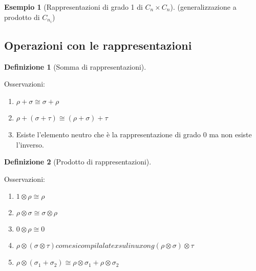 \documentclass[11pt]{article}
\theoremstyle{plain}
\theoremstyle{definition}
\newtheorem{defn}{Definizione}[section]
\newtheorem{exmp}{Esempio}[section]
\theoremstyle{remark}
\begin{document}
\begin{exmp}[Rappresentazioni di grado 1 di $C_n \times C_n$]


(generalizzazione a prodotto di $C_{n_i}$)
\end{exmp}














\newpage
\subsection{Operazioni con le rappresentazioni}

\begin{defn}[Somma di rappresentazioni]

\label{defn:somma di rappresentazioni}
\end{defn}

Osservazioni:

\begin{enumerate}
\item $\rho + \sigma \cong \sigma + \rho$
\item $\rho + (\sigma + \tau) \cong (\rho + \sigma ) + \tau$
\item Esiste l'elemento neutro che è la rappresentazione di grado 0 ma non esiste l'inverso.

\end{enumerate}





\begin{defn}[Prodotto di rappresentazioni]

\label{defn:prodotto di rappresentazioni}
\end{defn}


Osservazioni:


\begin{enumerate}
\item $1\otimes \rho \cong \rho$
\item $\rho \otimes \sigma \cong \sigma \otimes \rho$
\item $0 \otimes \rho \cong 0$
\item $\rho \otimes (\sigma \otimes \tau) come si compila latex su linuxong (\rho \otimes \sigma)\otimes \tau$
\item $\rho \otimes (\sigma_1 + \sigma_2) \cong \rho \otimes \sigma_1 + \rho \otimes \sigma_2$

\end{enumerate}
\end{document}
